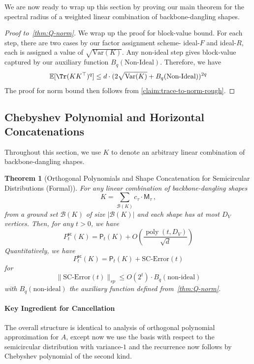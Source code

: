\documentclass[12pt]{article}
\def \E {\mathbb{E}}
\newcommand{\Var}{\mathrm{Var}}
\newtheorem{theorem}{Theorem}[section]
\newcommand{\poly}{\operatorname{poly}}
\newcommand{\calB}{\mathcal{B}}
\newcommand{\cm}{\mathsf{M} }
\newcommand{\fp}{\mathsf{P}}
\begin{document}
We are now ready to wrap up this section by proving our main theorem for the spectral radius of a weighted linear combination of backbone-dangling shapes.

\begin{proof}[Proof to~\cref{thm:Q-norm}]
	We wrap up the proof for block-value bound. For each step, there are two cases by our factor assignment scheme- ideal-$F$ and ideal-$R$, each is assigned a value of $ \sqrt{\Var(K)}.$  Any non-ideal step gives block-value captured by our auxiliary function $B_q(\text{Non-Ideal})$. Therefore, we have \[ 
	\E[\Tr(KK^\top)^{q}] \leq d \cdot (2\sqrt{\Var(K)} + B_q(\text{Non-Ideal}))^{2q}
	\]
 	 	The proof for norm bound then follows from \cref{claim:trace-to-norm-rough}.
\end{proof}
	


%




\subsection{Chebyshev Polynomial and Horizontal Concatenations}
Throughout this section, we use $K$ to denote an arbitrary linear combination of backbone-dangling shapes. 


\begin{theorem}[Orthogonal Polynomials and Shape Concatenation for Semicircular Distributions (Formal)]  
\label{thm:SC-concate}
For any linear combination of backbone-dangling shapes \[
K = \sum_{\calB(K)} c_\tau \cdot \cm_\tau \,,
 \]
	from a ground set $\calB(K)$ of size $|\calB(K)|$ and each shape has at most $D_V$ vertices. Then, for any $t>0$, we have \[ 
	P^{\mathsf{sc}}_t(K) = \fp_t(K) + O( \frac{\poly(t, D_V) }{\sqrt{d}} )
	\]
	Quantitatively, we have \[ 
	P^{\mathsf{sc}}_t(K) = \fp_t(K) + \text{SC-Error}(t)
	\]
	for \[
	\|\text{SC-Error}(t)\|_{sp} \leq O(2^{t}) \cdot B_q(\text{non-ideal})	\]
	with $B_q(\text{non-ideal})$ the auxiliary function defined from~\cref{thm:Q-norm}.
\end{theorem}

\paragraph{Key Ingredient for Cancellation}

The overall structure is identical to analysis of orthogonal polynomial approximation for $A$, except now we use the basis with respect to the semicircular distribution with variance-$1$ and the recurrence now follows by Chebyshev polynomial of the second kind.
\end{document}

